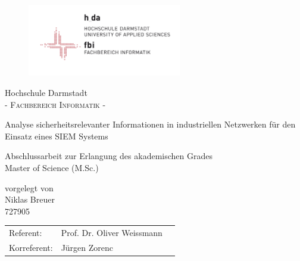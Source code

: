\pagestyle{empty} %

\begin{figure}[t]
	\centering
	\includegraphics[width=0.6\textwidth]{Abb/logo_fbi}
\end{figure}


\begin{center}
\Large Hochschule Darmstadt \\
\normalsize \textsc{- Fachbereich Informatik -} \\

\vspace{105 pt}

\Huge Analyse sicherheitsrelevanter Informationen in industriellen Netzwerken für den Einsatz eines SIEM Systems \\ 
\normalsize
\vspace{20 pt}

Abschlussarbeit zur Erlangung des akademischen Grades \\ 
Master of Science (M.Sc.) 

\vspace{75 pt}


vorgelegt von \\
\vspace{5 pt}
Niklas Breuer\\
727905
\vspace{115 pt}

\begin{tabular}[h]{p{4cm}l l}
	Referent: & Prof. Dr. Oliver Weissmann\\
	Korreferent: & Jürgen Zorenc
\end{tabular}


\end{center}